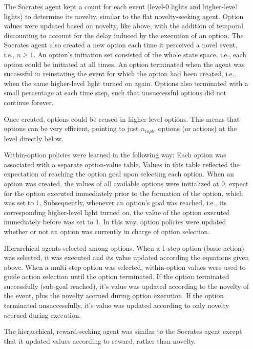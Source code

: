 \documentclass{article}
\begin{document}
The Socrates agent kept a count for each event (level-0 lights and higher-level lights) to determine its novelty, similar to the flat novelty-seeking agent. Option values were updated based on novelty, like above, with the addition of temporal discounting to account for the delay induced by the execution of an option. The Socrates agent also created a new option each time it perceived a novel event, i.e., $n \geq 1$. An option's initiation set consisted of the whole state space, i.e., each option could be initiated at all times. An option terminated when the agent was successful in reinstating the event for which the option had been created, i.e., when the same higher-level light turned on again. Options also terminated with a small percentage at each time step, such that unsuccessful options did not continue forever. 

Once created, options could be reused in higher-level options. This means that options can be very efficient, pointing to just $n_{tuple}$ options (or actions) at the level directly below.

Within-option policies were learned in the following way: Each option was associated with a separate option-value table. Values in this table reflected the expectation of reaching the option goal upon selecting each option. When an option was created, the values of all available options were initialized at 0, expect for the option executed immediately prior to the formation of the option, which was set to 1. Subsequently, whenever an option's goal was reached, i.e., its corresponding higher-level light turned on, the value of the option executed immediately before was set to 1. In this way, option policies were updated whether or not an option was currently in charge of option selection. 

Hierarchical agents selected among options. When a 1-step option (basic action) was selected, it was executed and its value updated according the equations given above. When a multi-step option was selected, within-option values were used to guide action selection until the option terminated. If the option terminated successfully (sub-goal reached), it's value was updated according to the novelty of the event, plus the novelty accrued during option execution. If the option terminated unsuccessfully, it's value was updated according to only novelty accrued during execution. 

The hierarchical, reward-seeking agent was similar to the Socrates agent except that it updated values according to reward, rather than novelty.
\end{document}
